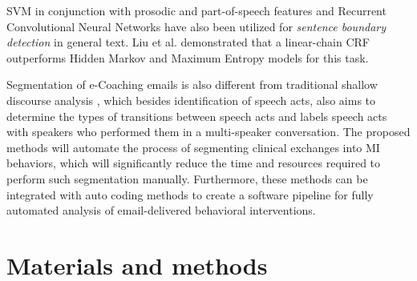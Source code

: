 \documentclass{amia}
\begin{document}
SVM in conjunction with prosodic and part-of-speech features \cite{kreuzthaler2015detection} and Recurrent Convolutional Neural Networks \cite{griffis2016quantitative} have also been utilized for \textit{sentence boundary detection} in general text. Liu et al. \cite{liu2005using} demonstrated that a linear-chain CRF outperforms Hidden Markov and Maximum Entropy models for this task. 

Segmentation of e-Coaching emails is also different from traditional shallow discourse analysis \cite{galley2003discourse}, which besides identification of speech acts, also aims to determine the types of transitions between speech acts and labels speech acts with speakers who performed them in a multi-speaker conversation. The proposed methods will automate the process of segmenting clinical exchanges into MI behaviors, which will significantly reduce the time and resources required to perform such segmentation manually. Furthermore, these methods can be integrated with auto coding methods \cite{hasan2016study,kotov2015interpretable} to create a software pipeline for fully automated analysis of email-delivered behavioral interventions.
  
\section*{Materials and methods}
\end{document}
